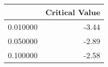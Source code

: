 \begin{tabular}{lr}
\toprule
 & Critical Value \\
\midrule
0.010000 & -3.44 \\
0.050000 & -2.89 \\
0.100000 & -2.58 \\
\bottomrule
\end{tabular}
